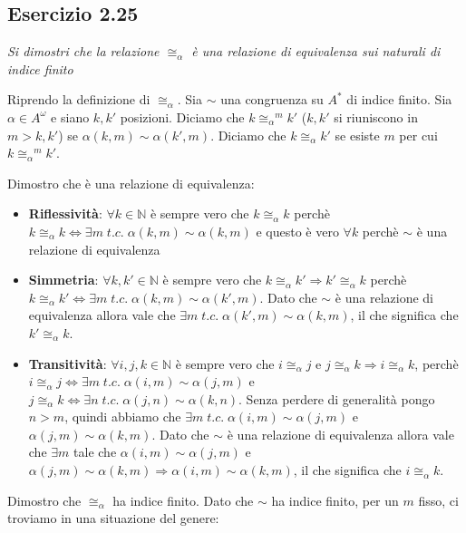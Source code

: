 \documentclass[12pt]{article}
\newcommand{\congAlpha}{\ensuremath{\cong_\alpha}\xspace}
\newcommand{\congAlphaM}{\ensuremath{\congAlpha^m}\xspace}
\begin{document}
\subsection*{Esercizio 2.25}
\textit{Si dimostri che la relazione $\congAlpha$ è una relazione di equivalenza sui naturali di indice finito}

Riprendo la definizione di $\congAlpha$. Sia $\sim$ una congruenza su $A^*$ di indice finito. Sia $\alpha \in A^\omega$ e siano $k,k'$ posizioni. Diciamo che 
$k\congAlphaM k'$ ($k,k'$ si riuniscono in $m>k,k'$) se $\alpha(k,m)\sim\alpha(k',m)$. Diciamo che $k\congAlpha k'$ se esiste $m$ per cui $k \congAlphaM k'$.

Dimostro che è una relazione di equivalenza:
\begin{itemize}
	\item \textbf{Riflessività}: $\forall k \in \mathbb{N}$ è sempre vero che $k\congAlpha k$ perchè $k\congAlpha k \Leftrightarrow \exists m\;t.c.\;\alpha(k,m)\sim\alpha(k,m)$ e questo è vero $\forall k$ perchè $\sim$ è una relazione di equivalenza
	\item \textbf{Simmetria}: $\forall k,k' \in \mathbb{N}$ è sempre vero che $k\congAlpha k' \Rightarrow k' \congAlpha k$ perchè $k\congAlpha k' \Leftrightarrow \exists m\;t.c.\;\alpha(k,m)\sim\alpha(k',m)$. Dato che $\sim$ è una relazione di equivalenza allora vale che $\exists m\;t.c.\;\alpha(k',m)\sim\alpha(k,m)$, il che significa che $k' \congAlpha k$.
	\item \textbf{Transitività}: $\forall i,j,k \in \mathbb{N}$ è sempre vero che $i\congAlpha j$ e $j\congAlpha k \Rightarrow i \congAlpha k$, perchè $i\congAlpha j \Leftrightarrow \exists m\;t.c.\;\alpha(i,m)\sim\alpha(j,m)$ e $j\congAlpha k \Leftrightarrow \exists n\;t.c.\;\alpha(j,n)\sim\alpha(k,n)$. Senza perdere di generalità pongo $n>m$, quindi abbiamo che $\exists m\;t.c.\;\alpha(i,m)\sim\alpha(j,m)$ e $\alpha(j,m)\sim\alpha(k,m)$. Dato che $\sim$ è una relazione di equivalenza allora vale che $\exists m$ tale che $\alpha(i,m)\sim\alpha(j,m)$ e $\alpha(j,m)\sim\alpha(k,m) \Rightarrow \alpha(i,m)\sim\alpha(k,m)$, il che significa che $i \congAlpha k$. 
\end{itemize}

Dimostro che $\congAlpha$ ha indice finito. Dato che $\sim$ ha indice finito, per un $m$ fisso, ci troviamo in una situazione del genere:
\end{document}
